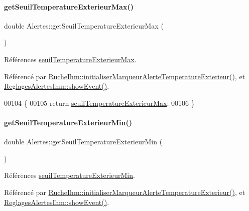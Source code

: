 \paragraph{\texorpdfstring{get\+Seuil\+Temperature\+Exterieur\+Max()}{getSeuilTemperatureExterieurMax()}}
{\footnotesize\ttfamily double Alertes\+::get\+Seuil\+Temperature\+Exterieur\+Max (\begin{DoxyParamCaption}{ }\end{DoxyParamCaption})}



Références \hyperlink{class_alertes_a207e0266c68ad378dae846382ba9f9dc}{seuil\+Temperature\+Exterieur\+Max}.



Référencé par \hyperlink{class_ruche_ihm_a410bcf0b7ac3ea7134af65d479802c48}{Ruche\+Ihm\+::initialiser\+Marqueur\+Alerte\+Temperature\+Exterieur()}, et \hyperlink{class_reglages_alertes_ihm_af47504b34ab0213fce9269c08b9e5544}{Reglages\+Alertes\+Ihm\+::show\+Event()}.


\begin{DoxyCode}
00104 \{
00105     \textcolor{keywordflow}{return} \hyperlink{class_alertes_a207e0266c68ad378dae846382ba9f9dc}{seuilTemperatureExterieurMax};
00106 \}
\end{DoxyCode}
\mbox{\label{class_alertes_a4451c6b077256d838e584a073444d83d}} 
\paragraph{\texorpdfstring{get\+Seuil\+Temperature\+Exterieur\+Min()}{getSeuilTemperatureExterieurMin()}}
{\footnotesize\ttfamily double Alertes\+::get\+Seuil\+Temperature\+Exterieur\+Min (\begin{DoxyParamCaption}{ }\end{DoxyParamCaption})}



Références \hyperlink{class_alertes_a0898c501edf5f07ac503b31b8a3d2454}{seuil\+Temperature\+Exterieur\+Min}.



Référencé par \hyperlink{class_ruche_ihm_a410bcf0b7ac3ea7134af65d479802c48}{Ruche\+Ihm\+::initialiser\+Marqueur\+Alerte\+Temperature\+Exterieur()}, et \hyperlink{class_reglages_alertes_ihm_af47504b34ab0213fce9269c08b9e5544}{Reglages\+Alertes\+Ihm\+::show\+Event()}.


